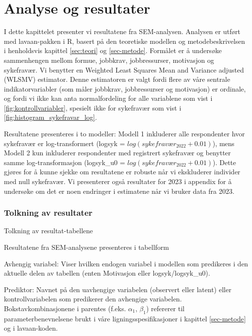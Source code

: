 \documentclass[
  12pt,
  a4paper,
  DIV=11,
  numbers=noendperiod]{scrartcl}
\begin{document}
\newpage

\section{Analyse og resultater}\label{sec-analyse}

I dette kapittelet presenter vi resultatene fra SEM-analysen. Analysen
er utført med lavaan-pakken i R, basert på den teoretiske modellen og
metodebeskrivelsen i henholdsvis kapittel \ref{sec:teori} og
\ref{sec-metode}. Formålet er å undersøke sammenhengen mellom formue,
jobbkrav, jobbressurser, motivasjon og sykefravær. Vi benytter en
Weighted Least Squares Mean and Variance adjusted (WLSMV) estimator.
Denne estimatoren er valgt fordi flere av våre sentrale
indikatorvariabler (som måler jobbkrav, jobbressurser og motivasjon) er
ordinale, og fordi vi ikke kan anta normalfordeling for alle variablene
som vist i \autoref{fig:kontrollvariabler}, spesielt ikke for sykefravær
som vist i \autoref{fig:histogram_sykefravar_log}.

Resultatene presenteres i to modeller: Modell 1 inkluderer alle
respondenter hvor sykefravær er log-transformert (logsyk =
\(log(sykefravær_2022+0.01)\)), mens Modell 2 kun inkluderer
respondenter med registrert sykefravær og benytter samme
log-transformasjon (logsyk\_u0 = \(log(sykefravær_2022+0.01)\)). Dette
gjøres for å kunne sjekke om resultatene er robuste når vi ekskluderer
individer med null sykefravær. Vi presenterer også resultater for 2023 i
appendix for å undersøke om det er noen endringer i estimatene når vi
bruker data fra 2023.

\subsubsection{Tolkning av resultater}\label{tolkning-av-resultater}

Tolkning av resultat-tabellene

Resultatene fra SEM-analysene presenteres i tabellform

Avhengig variabel: Viser hvilken endogen variabel i modellen som
predikeres i den aktuelle delen av tabellen (enten Motivasjon eller
logsyk/logsyk\_u0).

Prediktor: Navnet på den uavhengige variabelen (observert eller latent)
eller kontrollvariabelen som predikerer den avhengige variabelen.
Bokstavkombinasjonene i parentes (f.eks. \(\alpha_1\), \(\beta_1\))
refererer til parameterbenevnelsene brukt i våre ligningsspesifikasjoner
i kapittel \ref{sec-metode} og i lavaan-koden.
\end{document}
